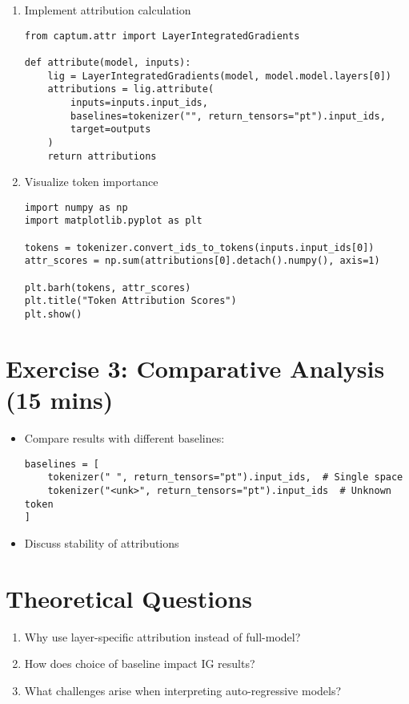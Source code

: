 \begin{enumerate}
\item Implement attribution calculation
\begin{verbatim}
from captum.attr import LayerIntegratedGradients

def attribute(model, inputs):
    lig = LayerIntegratedGradients(model, model.model.layers[0])
    attributions = lig.attribute(
        inputs=inputs.input_ids,
        baselines=tokenizer("", return_tensors="pt").input_ids,
        target=outputs
    )
    return attributions
\end{verbatim}

\item Visualize token importance
\begin{verbatim}
import numpy as np
import matplotlib.pyplot as plt

tokens = tokenizer.convert_ids_to_tokens(inputs.input_ids[0])
attr_scores = np.sum(attributions[0].detach().numpy(), axis=1)

plt.barh(tokens, attr_scores)
plt.title("Token Attribution Scores")
plt.show()
\end{verbatim}
\end{enumerate}

\section*{Exercise 3: Comparative Analysis (15 mins)}
\begin{itemize}
\item Compare results with different baselines:
\begin{verbatim}
baselines = [
    tokenizer(" ", return_tensors="pt").input_ids,  # Single space
    tokenizer("<unk>", return_tensors="pt").input_ids  # Unknown token
]
\end{verbatim}
\item Discuss stability of attributions
\end{itemize}

\section*{Theoretical Questions}
\begin{enumerate}
\item Why use layer-specific attribution instead of full-model?
\item How does choice of baseline impact IG results?
\item What challenges arise when interpreting auto-regressive models?
\end{enumerate}

